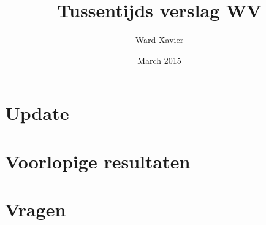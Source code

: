\documentclass{article}
\title{Tussentijds verslag WV}
\author{Ward  Xavier}
\date{March 2015}
\begin{document}
\maketitle

\section{Update}

\section{Voorlopige resultaten}

\section{Vragen}
\end{document}
